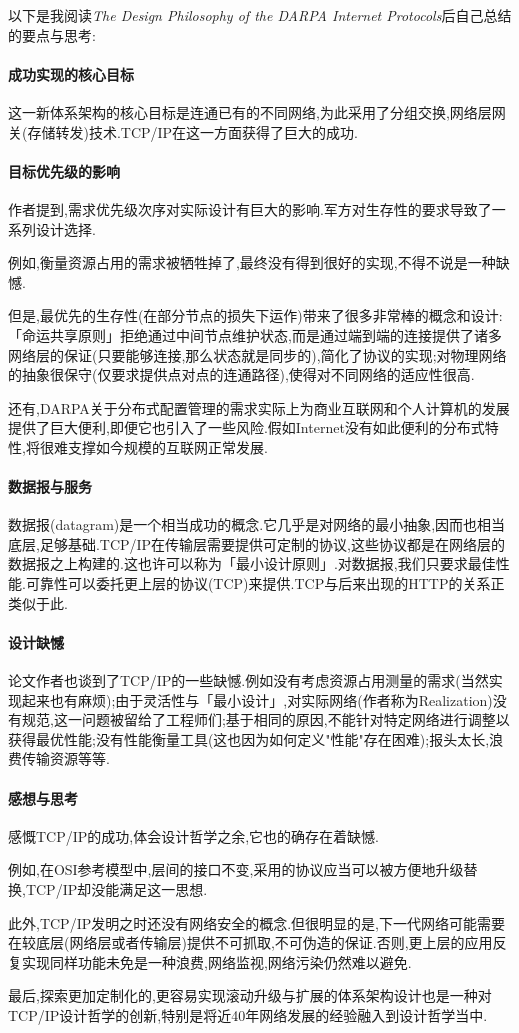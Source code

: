 \documentclass[a4paper]{article}
\begin{document}
\courseheader
{}
以下是我阅读\textit{The Design Philosophy of the DARPA Internet Protocols}后自己总结的要点与思考:
\paragraph{成功实现的核心目标}
这一新体系架构的核心目标是连通已有的不同网络,为此采用了分组交换,网络层网关(存储转发)技术.TCP/IP在这一方面获得了巨大的成功.
\paragraph{目标优先级的影响}
作者提到,需求优先级次序对实际设计有巨大的影响.军方对生存性的要求导致了一系列设计选择.

例如,衡量资源占用的需求被牺牲掉了,最终没有得到很好的实现,不得不说是一种缺憾.

但是,最优先的生存性(在部分节点的损失下运作)带来了很多非常棒的概念和设计:「命运共享原则」拒绝通过中间节点维护状态,而是通过端到端的连接提供了诸多网络层的保证(只要能够连接,那么状态就是同步的),简化了协议的实现;对物理网络的抽象很保守(仅要求提供点对点的连通路径),使得对不同网络的适应性很高.

还有,DARPA关于分布式配置管理的需求实际上为商业互联网和个人计算机的发展提供了巨大便利,即便它也引入了一些风险.假如Internet没有如此便利的分布式特性,将很难支撑如今规模的互联网正常发展.
\paragraph{数据报与服务}
数据报(datagram)是一个相当成功的概念.它几乎是对网络的最小抽象,因而也相当底层,足够基础.TCP/IP在传输层需要提供可定制的协议,这些协议都是在网络层的数据报之上构建的.这也许可以称为「最小设计原则」.对数据报,我们只要求最佳性能.可靠性可以委托更上层的协议(TCP)来提供.TCP与后来出现的HTTP的关系正类似于此.
\paragraph{设计缺憾}
论文作者也谈到了TCP/IP的一些缺憾.例如没有考虑资源占用测量的需求(当然实现起来也有麻烦);由于灵活性与「最小设计」,对实际网络(作者称为Realization)没有规范,这一问题被留给了工程师们;基于相同的原因,不能针对特定网络进行调整以获得最优性能;没有性能衡量工具(这也因为如何定义"性能"存在困难);报头太长,浪费传输资源等等.
\paragraph{感想与思考}
感慨TCP/IP的成功,体会设计哲学之余,它也的确存在着缺憾.

例如,在OSI参考模型中,层间的接口不变,采用的协议应当可以被方便地升级替换,TCP/IP却没能满足这一思想.

此外,TCP/IP发明之时还没有网络安全的概念.但很明显的是,下一代网络可能需要在较底层(网络层或者传输层)提供不可抓取,不可伪造的保证.否则,更上层的应用反复实现同样功能未免是一种浪费,网络监视,网络污染仍然难以避免.

最后,探索更加定制化的,更容易实现滚动升级与扩展的体系架构设计也是一种对TCP/IP设计哲学的创新,特别是将近40年网络发展的经验融入到设计哲学当中.
\end{document}
